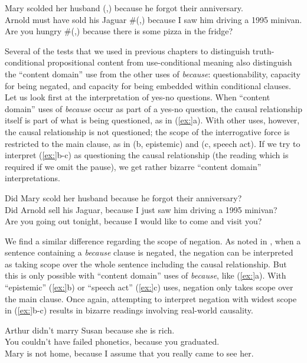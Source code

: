\ea
\ea Mary scolded her husband (,) because he forgot their anniversary.\\
\ex Arnold must have sold his Jaguar \#(,) because I saw him driving a 1995 minivan.\\
\ex Are you hungry \#(,) because there is some pizza in the fridge?
                       \z
\z


Several of the tests that we used in previous chapters to distinguish truth-conditional propositional content from use-conditional meaning also distinguish the “content domain” use from the other uses of \textit{because}: questionability, capacity for being negated, and capacity for being embedded within conditional clauses. Let us look first at the interpretation of yes-no questions. When “content domain” uses of \textit{because} occur as part of a yes-no question, the causal relationship itself is part of what is being questioned, as in (\ref{ex:}a). With other uses, however, the causal relationship is not questioned; the scope of the interrogative force is restricted to the main clause, as in (b, epistemic) and (c, speech act). If we try to interpret (\ref{ex:}b-c) as questioning the causal relationship (the reading which is required if we omit the pause), we get rather bizarre “content domain” interpretations.


\ea
\ea Did Mary scold her husband because he forgot their anniversary?\\
\ex Did Arnold sell his Jaguar, because I just saw him driving a 1995 minivan?\\
\ex Are you going out tonight, because I would like to come and visit you?
                       \z
\z


We find a similar difference regarding the scope of negation. As noted in , when a sentence containing a \textit{because} clause is negated, the negation can be interpreted as taking scope over the whole sentence including the causal relationship. But this is only possible with “content domain” uses of \textit{because}, like (\ref{ex:}a). With “epistemic” (\ref{ex:}b) or “speech act” (\ref{ex:}c) uses, negation only takes scope over the main clause. Once again, attempting to interpret negation with widest scope in (\ref{ex:}b-c) results in bizarre readings involving real-world causality.


\ea
\ea Arthur didn’t marry Susan because she is rich.\\
\ex You couldn’t have failed phonetics, because you graduated.\\
\ex Mary is not home, because I assume that you really came to see her.
                       \z
\z


